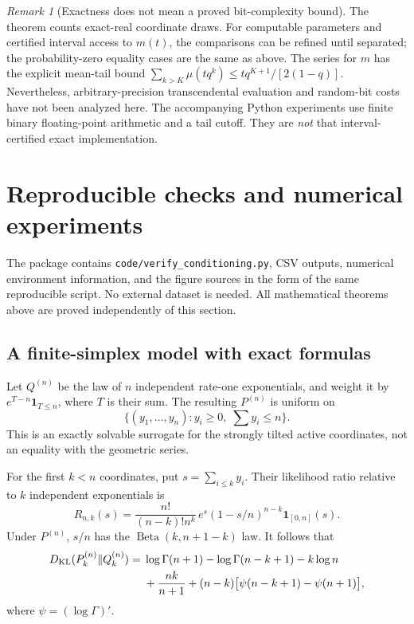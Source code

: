 \documentclass[11pt,a4paper]{article}
\numberwithin{equation}{section}
\theoremstyle{definition}
\theoremstyle{remark}
\newtheorem{remark}[remark]{Remark}
\newcommand{\KL}{D_{\mathrm{KL}}}
\newcommand{\ind}{\mathbf 1}
\begin{document}
\begin{remark}[Exactness does not mean a proved bit-complexity bound]
The theorem counts exact-real coordinate draws. For computable
parameters and certified interval access to $m(t)$, the comparisons
can be refined until separated; the probability-zero equality
cases are the same as above. The series for $m$ has the explicit
mean-tail bound
$\sum_{k>K}\mu(tq^k)\le tq^{K+1}/[2(1-q)]$.
Nevertheless, arbitrary-precision transcendental evaluation and
random-bit costs have not been analyzed here. The accompanying
Python experiments use finite binary floating-point arithmetic and
a tail cutoff. They are \emph{not} that interval-certified exact
implementation.
\end{remark}

\section{Reproducible checks and numerical experiments}
\label{sec:experiments}
The package contains \texttt{code/verify\_conditioning.py}, CSV
outputs, numerical environment information, and the figure sources
in the form of the same reproducible script. No external dataset is
needed. All mathematical theorems above are proved independently
of this section.

\subsection{A finite-simplex model with exact formulas}
Let $Q^{(n)}$ be the law of $n$ independent rate-one exponentials,
and weight it by $e^{T-n}\ind_{T\le n}$, where $T$ is their sum.
The resulting $P^{(n)}$ is uniform on
\[
 \{(y_1,\ldots,y_n): y_i\ge0,\;\sum y_i\le n\}.
\]
This is an exactly solvable surrogate for the strongly tilted
active coordinates, not an equality with the geometric series.

For the first $k<n$ coordinates, put $s=\sum_{i\le k}y_i$. Their
likelihood ratio relative to $k$ independent exponentials is
\begin{equation}\label{eq:simplex-ratio}
 R_{n,k}(s)=\frac{n!}{(n-k)!n^k}\,e^s(1-s/n)^{n-k}\ind_{[0,n]}(s).
\end{equation}
Under $P^{(n)}$, $s/n$ has the $\operatorname{Beta}(k,n+1-k)$ law.
It follows that
\begin{align}\label{eq:simplex-kl}
 \KL(P^{(n)}_k\Vert Q^{(n)}_k)
 ={}&\log\Gamma(n+1)-\log\Gamma(n-k+1)-k\log n\notag\\
 &+\frac{nk}{n+1}
 +(n-k)\bigl[\psi(n-k+1)-\psi(n+1)\bigr],
\end{align}
where $\psi=(\log\Gamma)'$.
\end{document}

